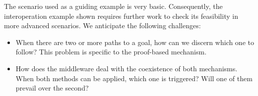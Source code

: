 The scenario used as a guiding example is very basic.
Consequently, the interoperation example shown requires further work to check its feasibility in more advanced scenarios.
We anticipate the following challenges:
\begin{itemize}
  \item When there are two or more paths to a goal, how can we discern which one to follow?
	This problem is specific to the proof-based mechanism.
  \item How does the middleware deal with the coexistence of both mechanisms.
	When both methods can be applied, which one is triggered?
	Will one of them prevail over the second?
\end{itemize}